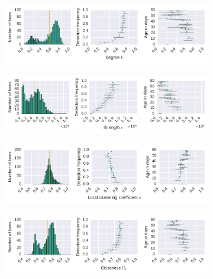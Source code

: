\begin{figure}[!h]
	\centering
	\begin{subfigure}[b]{1.0\textwidth}
	\centering
	\includegraphics[width=1.0\textwidth]{Figures/n2-stat-degreeAgeDetF.pdf}
	\end{subfigure}
	\begin{subfigure}[b]{1.0\textwidth}
	\centering
	\includegraphics[width=1.0\textwidth]{Figures/n2-stat-strengthAgeDetF.pdf}
	\end{subfigure}
	\begin{subfigure}[b]{1.0\textwidth}
	\centering
	\includegraphics[width=1.0\textwidth]{Figures/n2-stat-lccAgeDetF.pdf}
	\end{subfigure}
	\begin{subfigure}[b]{1.0\textwidth}
	\centering
	\includegraphics[width=1.0\textwidth]{Figures/n2-stat-closenessAgeDetF.pdf}

\end{subfigure}
\end{figure}
